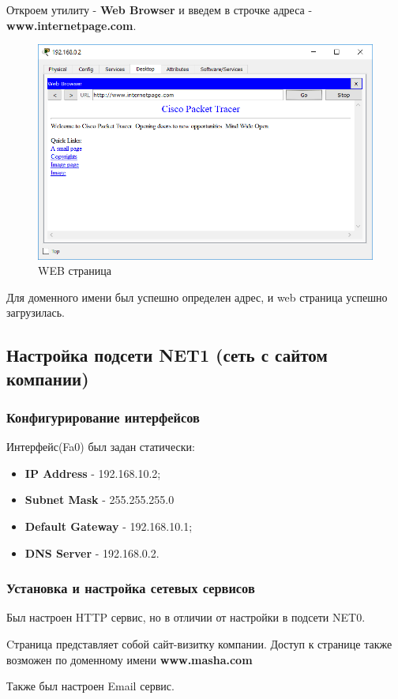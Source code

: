 \documentclass[14pt,a4paper,report]{report}
\begin{document}
Откроем утилиту - \textbf{Web Browser} и введем в строчке адреса - \textbf{www.internetpage.com}. 
\clearpage
\begin{figure}[h]
  \centering
  \includegraphics[width=.8\textwidth]{img/net0_0_2__5}
  \caption{WEB страница}
\end{figure}


Для доменного имени был успешно определен адрес, и web страница успешно загрузилась.

\subsection{Настройка подсети NET1 (сеть с сайтом компании)}
\subsubsection{Конфигурирование интерфейсов}
Интерфейс(Fa0) был задан статически:
\begin{itemize}
\item \textbf{IP Address} - 192.168.10.2;
\item \textbf{Subnet Mask} - 255.255.255.0
\item \textbf{Default Gateway} - 192.168.10.1;
\item \textbf{DNS Server} - 192.168.0.2.
\end{itemize}
\subsubsection{Установка и настройка сетевых сервисов}
Был настроен HTTP сервис, но в отличии от настройки в подсети NET0.

Cтраница представляет собой сайт-визитку компании. Доступ к странице также возможен по доменному имени \textbf{www.masha.com}

Также был настроен Email сервис.
\end{document}
